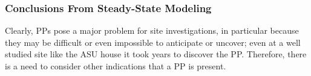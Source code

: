 \documentclass[journal=esthag,manuscript=article]{achemso}
\begin{document}





\subsubsection{Conclusions From Steady-State Modeling}

Clearly, PPs pose a major problem for site investigations, in particular because they may be difficult or even impossible to anticipate or uncover; even at a well studied site like the ASU house it took years to discover the PP.
Therefore, there is a need to consider other indications that a PP is present.
\end{document}
